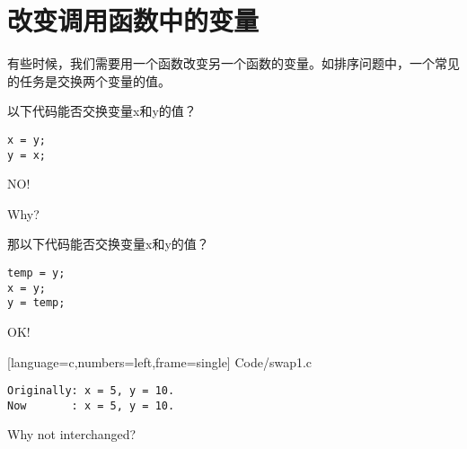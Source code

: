 \section{改变调用函数中的变量}
\begin{frame}[fragile]\ft{\secname}
有些时候，我们需要用一个函数改变另一个函数的变量。如排序问题中，一个常见的任务是交换两个变量的值。
\end{frame}

\begin{frame}[fragile]\ft{\secname}
以下代码能否交换变量x和y的值{\Large ？}
\begin{lstlisting}[backgroundcolor=\color{red!10}]
x = y;
y = x;
\end{lstlisting}
\pause \vspace{0.1in}

\begin{center}
{\Large NO!}
\end{center}
\pause\vspace{0.1in}

\begin{center}
{\Large Why?} 
\end{center}
\end{frame}

\begin{frame}[fragile]\ft{\secname}
那以下代码能否交换变量x和y的值{\Large ？}
\begin{lstlisting}[backgroundcolor=\color{red!10}]
temp = y;
x = y;
y = temp;
\end{lstlisting}
\pause \vspace{0.1in}

\begin{center}
{\Large OK!}
\end{center}

\end{frame}

\begin{frame}\ft{\secname}
  
  [language=c,numbers=left,frame=single]
  {Code/swap1.c}
\end{frame}


\begin{frame}[fragile]\ft{\secname}
\begin{lstlisting}[backgroundcolor=\color{red!10}]
Originally: x = 5, y = 10.
Now       : x = 5, y = 10.
\end{lstlisting}
\pause \vspace{0.1in}

\begin{center}
{\Large Why not interchanged?}
\end{center}


\end{frame}

